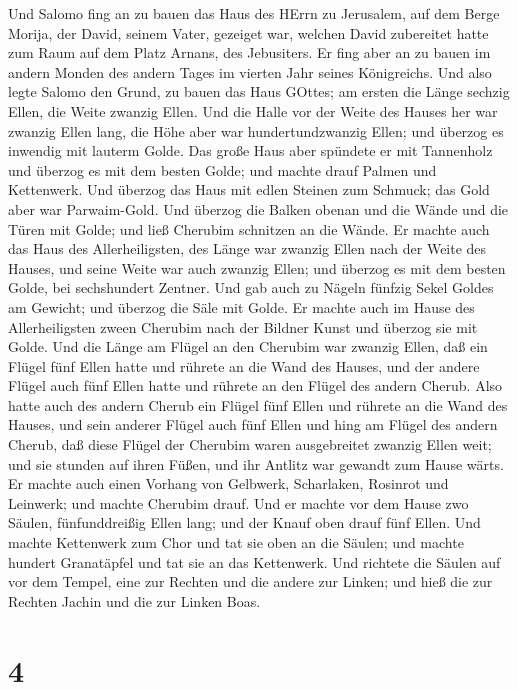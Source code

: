  Und Salomo fing an zu bauen das Haus des HErrn zu
Jerusalem, auf dem Berge Morija, der David, seinem Vater, gezeiget war,
welchen David zubereitet hatte zum Raum auf dem Platz Arnans, des
Jebusiters.  Er fing aber an zu bauen im andern Monden des
andern Tages im vierten Jahr seines Königreichs.  Und also
legte Salomo den Grund, zu bauen das Haus GOttes; am ersten die Länge
sechzig Ellen, die Weite zwanzig Ellen.  Und die Halle vor
der Weite des Hauses her war zwanzig Ellen lang, die Höhe aber war
hundertundzwanzig Ellen; und überzog es inwendig mit lauterm Golde.
 Das große Haus aber spündete er mit Tannenholz und überzog
es mit dem besten Golde; und machte drauf Palmen und Kettenwerk.
 Und überzog das Haus mit edlen Steinen zum Schmuck; das
Gold aber war Parwaim-Gold.  Und überzog die Balken obenan
und die Wände und die Türen mit Golde; und ließ Cherubim schnitzen an
die Wände.  Er machte auch das Haus des Allerheiligsten, des
Länge war zwanzig Ellen nach der Weite des Hauses, und seine Weite war
auch zwanzig Ellen; und überzog es mit dem besten Golde, bei
sechshundert Zentner.  Und gab auch zu Nägeln fünfzig Sekel
Goldes am Gewicht; und überzog die Säle mit Golde.  Er
machte auch im Hause des Allerheiligsten zween Cherubim nach der Bildner
Kunst und überzog sie mit Golde.  Und die Länge am Flügel
an den Cherubim war zwanzig Ellen, daß ein Flügel fünf Ellen hatte und
rührete an die Wand des Hauses, und der andere Flügel auch fünf Ellen
hatte und rührete an den Flügel des andern Cherub.  Also
hatte auch des andern Cherub ein Flügel fünf Ellen und rührete an die
Wand des Hauses, und sein anderer Flügel auch fünf Ellen und hing am
Flügel des andern Cherub,  daß diese Flügel der Cherubim
waren ausgebreitet zwanzig Ellen weit; und sie stunden auf ihren Füßen,
und ihr Antlitz war gewandt zum Hause wärts.  Er machte
auch einen Vorhang von Gelbwerk, Scharlaken, Rosinrot und Leinwerk; und
machte Cherubim drauf.  Und er machte vor dem Hause zwo
Säulen, fünfunddreißig Ellen lang; und der Knauf oben drauf fünf Ellen.
 Und machte Kettenwerk zum Chor und tat sie oben an die
Säulen; und machte hundert Granatäpfel und tat sie an das Kettenwerk.
 Und richtete die Säulen auf vor dem Tempel, eine zur
Rechten und die andere zur Linken; und hieß die zur Rechten Jachin und
die zur Linken Boas.

\hypertarget{section-3}{%
\section{4}\label{section-3}}

